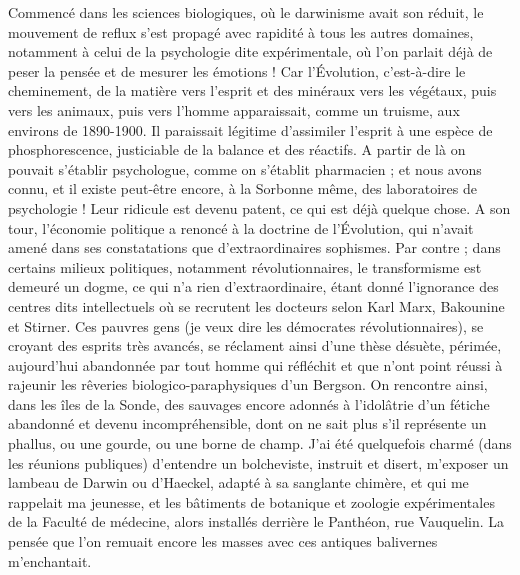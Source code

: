 \documentclass[french,twoside]{book} %
\begin{document}
Commencé dans les sciences biologiques, où le darwinisme avait son réduit, le mouvement de reflux s’est propagé avec rapidité à tous les autres domaines, notamment à celui de la psychologie dite expérimentale, où l’on parlait déjà de peser la pensée et de mesurer les émotions ! Car l’Évolution, c’est-à-dire le cheminement, de la matière vers l’esprit et des minéraux vers les végétaux, puis vers les animaux, puis vers l’homme apparaissait, comme un truisme, aux environs de 1890-1900. Il paraissait légitime d’assimiler l’esprit à une espèce de phosphorescence, justiciable de la balance et des réactifs. A partir de là on pouvait s’établir psychologue, comme on s’établit pharmacien ; et nous avons connu, et il existe peut-être encore, à la Sorbonne même, des laboratoires de psychologie ! Leur ridicule est devenu patent, ce qui est déjà quelque chose. A son tour, l’économie politique a renoncé à la doctrine de l’Évolution, qui n’avait amené dans ses constatations que d’extraordinaires sophismes. Par contre ; dans certains milieux politiques, notamment révolutionnaires, le transformisme est demeuré un dogme, ce qui n’a rien d’extraordinaire, étant donné l’ignorance des centres dits intellectuels où se recrutent les docteurs selon Karl Marx, Bakounine et Stirner. Ces pauvres gens (je veux dire les démocrates révolutionnaires), se croyant des esprits très avancés, se réclament ainsi d’une thèse désuète, périmée, aujourd’hui abandonnée par tout homme qui réfléchit et que n’ont point réussi à rajeunir les rêveries biologico-paraphysiques d’un Bergson. On rencontre ainsi, dans les îles de la Sonde, des sauvages encore adonnés à l’idolâtrie d’un fétiche abandonné et devenu incompréhensible, dont on ne sait plus s’il représente un phallus, ou une gourde, ou une borne de champ. J’ai été quelquefois charmé (dans les réunions publiques) d’entendre un bolcheviste, instruit et disert, m’exposer un lambeau de Darwin ou d’Haeckel, adapté à sa sanglante chimère, et qui me rappelait ma jeunesse, et les bâtiments de botanique et zoologie expérimentales de la Faculté de médecine, alors installés derrière le Panthéon, rue Vauquelin. La pensée que l’on remuait encore les masses avec ces antiques balivernes m’enchantait.\par
\end{document}
